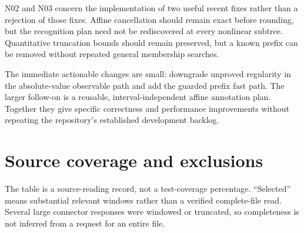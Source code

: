 \documentclass[11pt,a4paper]{article}
\begin{document}
N02 and N03 concern the implementation of two useful recent fixes rather than
a rejection of those fixes. Affine cancellation should remain exact before
rounding, but the recognition plan need not be rediscovered at every nonlinear
subtree. Quantitative truncation bounds should remain preserved, but a known
prefix can be removed without repeated general membership searches.

The immediate actionable changes are small: downgrade unproved regularity in
the absolute-value observable path and add the guarded prefix fast path. The
larger follow-on is a reusable, interval-independent affine annotation plan.
Together they give specific correctness and performance improvements without
repeating the repository's established development backlog.

\appendix
\section{Source coverage and exclusions}\label{app:coverage}
The table is a source-reading record, not a test-coverage percentage. ``Selected''
means substantial relevant windows rather than a verified complete-file read.
Several large connector responses were windowed or truncated, so completeness
is not inferred from a request for an entire file.
\end{document}
